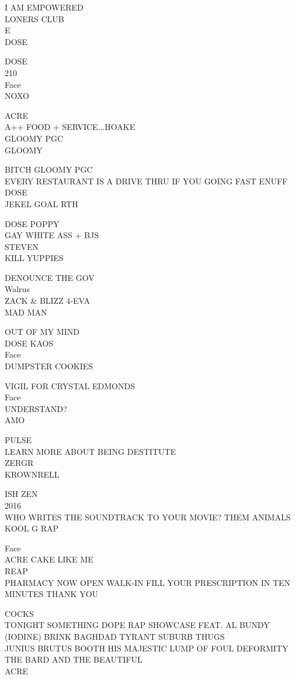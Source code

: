 \documentclass[10pt,letterpaper]{article}
\begin{document}
I AM EMPOWERED\\
LONERS CLUB\\
E\\
DOSE

DOSE\\
210\\
Face\\
NOXO

ACRE\\
A++ FOOD + SERVICE...HOAKE\\
GLOOMY PGC\\
GLOOMY

BITCH GLOOMY PGC\\
EVERY RESTAURANT IS A DRIVE THRU IF YOU GOING FAST ENUFF\\
DOSE\\
JEKEL GOAL RTH

DOSE POPPY\\
GAY WHITE ASS + BJS\\
STEVEN\\
KILL YUPPIES

DENOUNCE THE GOV\\
Walrus\\
ZACK \& BLIZZ 4{-}EVA\\
MAD MAN

OUT OF MY MIND\\
DOSE KAOS\\
Face\\
DUMPSTER COOKIES

VIGIL FOR CRYSTAL EDMONDS\\
Face\\
UNDERSTAND?\\
AMO

PULSE\\
LEARN MORE ABOUT BEING DESTITUTE\\
ZERGR\\
KROWNRELL

ISH ZEN\\
2016\\
WHO WRITES THE SOUNDTRACK TO YOUR MOVIE?  THEM ANIMALS\\
KOOL G RAP

Face\\
ACRE CAKE LIKE ME\\
REAP\\
PHARMACY NOW OPEN WALK{-}IN FILL YOUR PRESCRIPTION IN TEN MINUTES THANK YOU

COCKS\\
TONIGHT SOMETHING DOPE RAP SHOWCASE FEAT. AL BUNDY (IODINE) BRINK BAGHDAD TYRANT SUBURB THUGS\\
JUNIUS BRUTUS BOOTH HIS MAJESTIC LUMP OF FOUL DEFORMITY THE BARD AND THE BEAUTIFUL\\
ACRE
\end{document}
